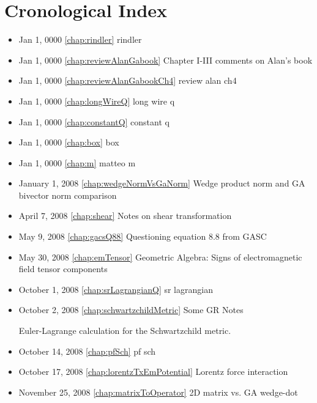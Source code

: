 \chapter{Cronological Index}
\label{chap:Cronology}

\begin{itemize}

\item Jan 1, 0000 \ref{chap:rindler} rindler

\item Jan 1, 0000 \ref{chap:reviewAlanGabook} Chapter I-III comments on Alan's book

\item Jan 1, 0000 \ref{chap:reviewAlanGabookCh4} review alan ch4

\item Jan 1, 0000 \ref{chap:longWireQ} long wire q

\item Jan 1, 0000 \ref{chap:constantQ} constant q

\item Jan 1, 0000 \ref{chap:box} box

\item Jan 1, 0000 \ref{chap:m} matteo m

\item January 1, 2008 \ref{chap:wedgeNormVsGaNorm} Wedge product norm and GA bivector norm comparison

\item April 7, 2008 \ref{chap:shear} Notes on shear transformation

\item May 9, 2008 \ref{chap:gacsQ88} Questioning equation 8.8 from GASC

\item May 30, 2008 \ref{chap:emTensor} Geometric Algebra: Signs of electromagnetic field tensor components

\item October 1, 2008 \ref{chap:srLagrangianQ} sr lagrangian

\item October 2, 2008 \ref{chap:schwartzchildMetric} Some GR Notes

Euler-Lagrange calculation for the Schwartzchild metric.\item October 14, 2008 \ref{chap:pfSch} pf sch

\item October 17, 2008 \ref{chap:lorentzTxEmPotential} Lorentz force interaction

\item November 25, 2008 \ref{chap:matrixToOperator} 2D matrix vs. GA wedge-dot


\end{itemize}
